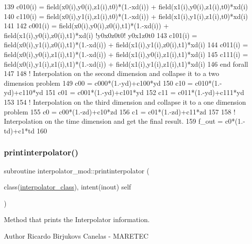 \begin{DoxyCode}
139         c010(i) = field(x0(i),y0(i),z1(i),t0)*(1.-xd(i)) + field(x1(i),y0(i),z1(i),t0)*xd(i)
140         c110(i) = field(x0(i),y1(i),z1(i),t0)*(1.-xd(i)) + field(x1(i),y1(i),z1(i),t0)*xd(i)
141 
142         c001(i) = field(x0(i),y0(i),z0(i),t1)*(1.-xd(i)) + field(x1(i),y0(i),z0(i),t1)*xd(i) \textcolor{comment}{!y0x0z0t0! 
       y0x1z0t0}
143         c101(i) = field(x0(i),y1(i),z0(i),t1)*(1.-xd(i)) + field(x1(i),y1(i),z0(i),t1)*xd(i)
144         c011(i) = field(x0(i),y0(i),z1(i),t1)*(1.-xd(i)) + field(x1(i),y0(i),z1(i),t1)*xd(i)
145         c111(i) = field(x0(i),y1(i),z1(i),t1)*(1.-xd(i)) + field(x1(i),y1(i),z1(i),t1)*xd(i)
146 \textcolor{keywordflow}{    end forall}
147 
148     \textcolor{comment}{! Interpolation on the second dimension and collapse it to a two dimension problem}
149     c00 = c000*(1.-yd)+c100*yd
150     c10 = c010*(1.-yd)+c110*yd
151     c01 = c001*(1.-yd)+c101*yd
152     c11 = c011*(1.-yd)+c111*yd
153 
154     \textcolor{comment}{! Interpolation on the third dimension and collapse it to a one dimension problem}
155     c0 = c00*(1.-zd)+c10*zd
156     c1 = c01*(1.-zd)+c11*zd
157 
158     \textcolor{comment}{! Interpolation on the time dimension and get the final result.}
159     f\_out = c0*(1.-td)+c1*td
160 
\end{DoxyCode}
\mbox{\label{namespaceinterpolator__mod_a9b149bc8a3da5d1864b8c049f8b00697}} 
\subsubsection{\texorpdfstring{printinterpolator()}{printinterpolator()}}
{\footnotesize\ttfamily subroutine interpolator\+\_\+mod\+::printinterpolator (\begin{DoxyParamCaption}\item[{class(\mbox{\hyperlink{structinterpolator__mod_1_1interpolator__class}{interpolator\+\_\+class}}), intent(inout)}]{self }\end{DoxyParamCaption})\hspace{0.3cm}{\ttfamily [private]}}



Method that prints the Interpolator information. 

\begin{DoxyAuthor}{Author}
Ricardo Birjukovs Canelas -\/ M\+A\+R\+E\+T\+EC 
\end{DoxyAuthor}


